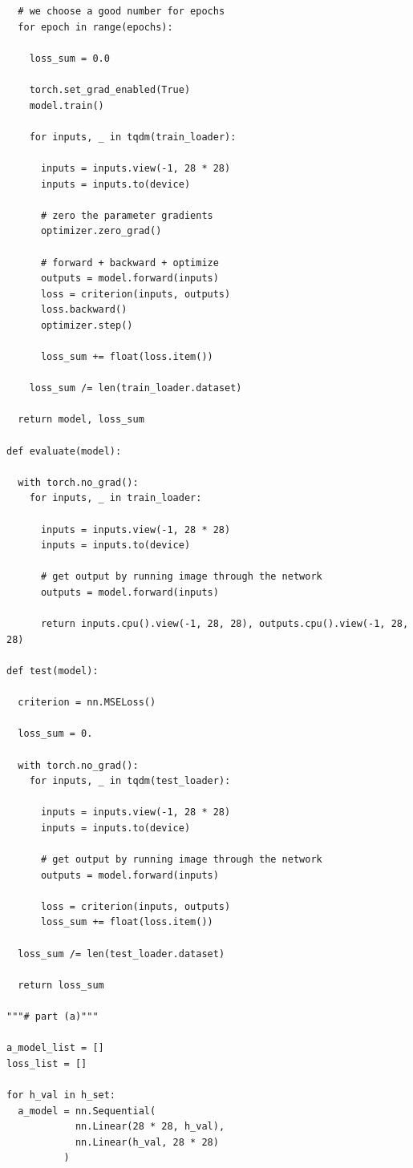\documentclass{article}
\newcommand{\1}{\mathbf{1}}
\begin{document}
{\begin{verbatim}
  # we choose a good number for epochs
  for epoch in range(epochs):

    loss_sum = 0.0

    torch.set_grad_enabled(True)
    model.train()

    for inputs, _ in tqdm(train_loader):
      
      inputs = inputs.view(-1, 28 * 28)
      inputs = inputs.to(device)

      # zero the parameter gradients
      optimizer.zero_grad()

      # forward + backward + optimize
      outputs = model.forward(inputs)
      loss = criterion(inputs, outputs)
      loss.backward()
      optimizer.step()
        
      loss_sum += float(loss.item())
    
    loss_sum /= len(train_loader.dataset)

  return model, loss_sum

def evaluate(model):

  with torch.no_grad():
    for inputs, _ in train_loader:

      inputs = inputs.view(-1, 28 * 28)
      inputs = inputs.to(device)

      # get output by running image through the network 
      outputs = model.forward(inputs)

      return inputs.cpu().view(-1, 28, 28), outputs.cpu().view(-1, 28, 28)

def test(model):

  criterion = nn.MSELoss()

  loss_sum = 0.

  with torch.no_grad():
    for inputs, _ in tqdm(test_loader):

      inputs = inputs.view(-1, 28 * 28)
      inputs = inputs.to(device)

      # get output by running image through the network 
      outputs = model.forward(inputs)

      loss = criterion(inputs, outputs)
      loss_sum += float(loss.item())

  loss_sum /= len(test_loader.dataset)

  return loss_sum

"""# part (a)"""

a_model_list = []
loss_list = []

for h_val in h_set:
  a_model = nn.Sequential(
            nn.Linear(28 * 28, h_val),
            nn.Linear(h_val, 28 * 28)
          )


\end{verbatim}}
\end{document}
